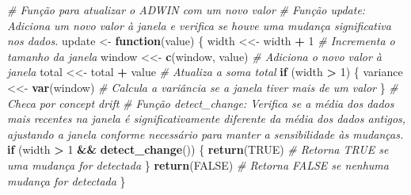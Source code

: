\documentclass[
]{article}
\newenvironment{Shaded}{\begin{snugshade}}{\end{snugshade}}
\newcommand{\CommentTok}[1]{\textcolor[rgb]{0.56,0.35,0.01}{\textit{#1}}}
\newcommand{\ConstantTok}[1]{\textcolor[rgb]{0.56,0.35,0.01}{#1}}
\newcommand{\ControlFlowTok}[1]{\textcolor[rgb]{0.13,0.29,0.53}{\textbf{#1}}}
\newcommand{\DecValTok}[1]{\textcolor[rgb]{0.00,0.00,0.81}{#1}}
\newcommand{\FunctionTok}[1]{\textcolor[rgb]{0.13,0.29,0.53}{\textbf{#1}}}
\newcommand{\NormalTok}[1]{#1}
\newcommand{\OtherTok}[1]{\textcolor[rgb]{0.56,0.35,0.01}{#1}}
\newcommand{\SpecialCharTok}[1]{\textcolor[rgb]{0.81,0.36,0.00}{\textbf{#1}}}
\begin{document}
\begin{Shaded}
\begin{Highlighting}[]
  \CommentTok{\# Função para atualizar o ADWIN com um novo valor}
  \CommentTok{\# Função update: Adiciona um novo valor à janela e verifica se houve uma mudança significativa nos dados.}
\NormalTok{  update }\OtherTok{\textless{}{-}} \ControlFlowTok{function}\NormalTok{(value) \{}
\NormalTok{    width }\OtherTok{\textless{}\textless{}{-}}\NormalTok{ width }\SpecialCharTok{+} \DecValTok{1} \CommentTok{\# Incrementa o tamanho da janela}
\NormalTok{    window }\OtherTok{\textless{}\textless{}{-}} \FunctionTok{c}\NormalTok{(window, value) }\CommentTok{\# Adiciona o novo valor à janela}
\NormalTok{    total }\OtherTok{\textless{}\textless{}{-}}\NormalTok{ total }\SpecialCharTok{+}\NormalTok{ value }\CommentTok{\# Atualiza a soma total}
    \ControlFlowTok{if}\NormalTok{ (width }\SpecialCharTok{\textgreater{}} \DecValTok{1}\NormalTok{) \{}
\NormalTok{      variance }\OtherTok{\textless{}\textless{}{-}} \FunctionTok{var}\NormalTok{(window) }\CommentTok{\# Calcula a variância se a janela tiver mais de um valor}
\NormalTok{    \}}
    \CommentTok{\# Checa por concept drift}
    \CommentTok{\# Função detect\_change: Verifica se a média dos dados mais recentes na janela é significativamente diferente da média dos       dados antigos, ajustando a janela conforme necessário para manter a sensibilidade às mudanças.}
    \ControlFlowTok{if}\NormalTok{ (width }\SpecialCharTok{\textgreater{}} \DecValTok{1} \SpecialCharTok{\&\&} \FunctionTok{detect\_change}\NormalTok{()) \{}
      \FunctionTok{return}\NormalTok{(}\ConstantTok{TRUE}\NormalTok{) }\CommentTok{\# Retorna TRUE se uma mudança for detectada}
\NormalTok{    \}}
    \FunctionTok{return}\NormalTok{(}\ConstantTok{FALSE}\NormalTok{) }\CommentTok{\# Retorna FALSE se nenhuma mudança for detectada}
\NormalTok{  \}}
  

\end{Highlighting}
\end{Shaded}
\end{document}
